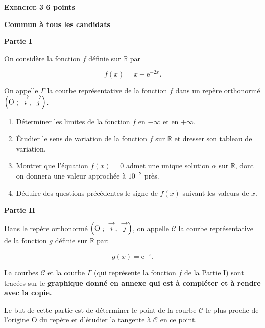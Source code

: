\documentclass[11pt]{article}
\newcommand{\R}{\mathbb{R}}
\newcommand{\vect}[1]{\overrightarrow{\,\mathstrut#1\,}}
\def\Oij{$\left(\text{O}~;~\vect{\imath},~\vect{\jmath}\right)$}
\begin{document}
\bigskip

\textbf{\textsc{Exercice 3} \hfill 6 points}

\textbf{Commun à tous les candidats}

\medskip

\begin{center}\textbf{Partie I}\end{center}

On considère la fonction $f$ définie sur $\R$ par 

\[f(x) = x - \text{e}^{-2x}.\]

On appelle $\Gamma$ la courbe représentative de la fonction $f$ dans un repère orthonormé \Oij.

\medskip

\begin{enumerate}
\item Déterminer les limites de la fonction $f$ en $- \infty$ et en $+ \infty$.
\item Étudier le sens de variation de la fonction $f$ sur $\R$ et dresser son tableau de variation.
\item Montrer que l'équation $f(x) = 0$ admet une unique solution $\alpha$ sur $\R$, dont on donnera une valeur approchée à $10^{-2}$ près.
\item Déduire des questions précédentes le signe de $f(x)$ suivant les valeurs de $x$.
\end{enumerate}

\begin{center}\textbf{Partie II}\end{center}


Dans le repère orthonormé \Oij, on appelle $\mathcal{C}$ la courbe représentative de la fonction $g$ définie sur $\R$ par:

\[g(x) = \text{e}^{-x}.\]

 La courbes $\mathcal{C}$ et la courbe $\Gamma$ (qui représente la fonction $f$ de la Partie I) sont tracées sur le \textbf{graphique donné en annexe qui est à compléter et à rendre avec la copie.}

\smallskip

Le but de cette partie est de déterminer le point de la courbe $\mathcal{C}$ le plus proche de l'origine O du repère et d'étudier la tangente à $\mathcal{C}$ en ce point.

\medskip
\end{document}
